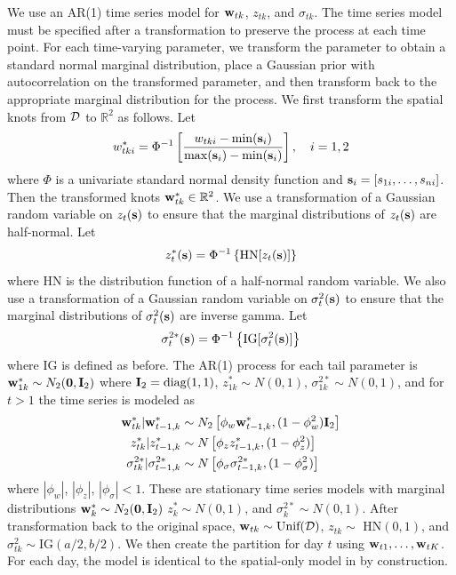 We use an AR(1) time series model for $\mathbf{w}_{tk}$, $z_{tk}$, and $\sigma_{tk}$.
The time series model must be specified after a transformation to preserve the \skewt process at each time point.
For each time-varying parameter, we transform the parameter to obtain a standard normal marginal distribution, place a Gaussian prior with autocorrelation on the transformed parameter, and then transform back to the appropriate marginal distribution for the \skewt process.
We first transform the spatial knots from ${\cal D}$ to $\mathbb{R}^2$ as follows.
Let
\begin{align} \label{steq:wstar}
  w^*_{tki} = \Phi^{-1}\left[ \frac{ w_{tki} - \min(\mathbf{s}_i)}{ \max(\mathbf{s}_i) - \min(\mathbf{s}_i) } \right], \quad i = 1, 2
\end{align}
where $\Phi$ is a univariate standard normal density function and $\mathbf{s}_i = [s_{1i}, \ldots, s_{ni}]$.
Then the transformed knots $\mathbf{w}^*_{tk} \in \mathbb{R}^2$.
We use a transformation of a Gaussian random variable on $z_{t}(\mathbf{s})$ to ensure that the marginal distributions of $z_t(\mathbf{s})$ are half-normal.
Let
\begin{align} \label{steq:zstar}
  z^*_t(\mathbf{s}) = \Phi^{-1}\left\{ \text{HN}[z_t(\mathbf{s})] \right\}
\end{align}
where HN is the distribution function of a half-normal random variable.
We also use a transformation of a Gaussian random variable on $\sigma^2_t(\mathbf{s})$ to ensure that the marginal distributions of $\sigma^2_t(\mathbf{s})$ are inverse gamma.
Let
\begin{align} \label{steq:sigmastar}
  \sigma^{2*}_t(\mathbf{s}) =\Phi^{-1}\left\{ \text{IG}[\sigma^2_t(\mathbf{s})] \right\}
\end{align}
where IG is defined as before.
The AR(1) process for each tail parameter is $\mathbf{w}^*_{1k} \sim N_2(\mathbf{0}, \mathbf{I}_2)$ where $\mathbf{I}_2 = \text{diag}(1, 1)$, $z^*_{1k} \sim N(0, 1)$, $\sigma^{2*}_{1k} \sim N(0, 1)$, and for $t > 1$ the time series is modeled as
\begin{align}
  \mathbf{w}^*_{tk} | \mathbf{w}^*_{t-1, k} &\sim N_2\left[\phi_w \mathbf{w}^*_{t-1, k}, (1 - \phi_w^2) \mathbf{I}_2 \right] \label{steq:ts-wstar}\\
  z^*_{tk} | z^*_{t-1, k} &\sim N \left[\phi_z z^*_{t-1, k}, (1 - \phi_z^2)\right] \label{steq:ts-zstar} \\
  \sigma^{2*}_{tk} | \sigma^{2*}_{t-1, k} &\sim N \left[\phi_\sigma \sigma^{2*}_{t-1, k}, (1 - \phi_\sigma^2) \right] \label{steq:ts-sigmastar}
\end{align}
where $|\phi_w|$, $|\phi_z|$, $|\phi_\sigma| < 1$.
These are stationary time series models with marginal distributions \hbox{$\mathbf{w}^*_{k} \sim N_2(\mathbf{0}, \mathbf{I}_2)$} \hbox{$z^*_{k} \sim N(0, 1)$}, and \hbox{$\sigma^{2*}_{k} \sim N(0, 1)$}.
After transformation back to the original space, $\mathbf{w}_{tk} \sim \text{Unif}({\cal D})$, $z_{tk} \sim $ HN$(0, 1)$, and $\sigma^2_{tk} \sim \text{IG}(a / 2, b / 2)$.
We then create the partition for day $t$ using $\mathbf{w}_{t1}, \ldots, \mathbf{w}_{tK}$.
For each day, the model is identical to the spatial-only model in  by construction.

